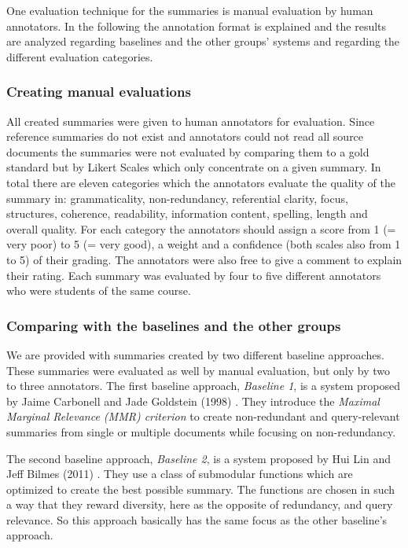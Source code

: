 One evaluation technique for the summaries is manual evaluation by human annotators. In the following the annotation format is explained and the results are analyzed regarding baselines and the other groups' systems and regarding the different evaluation categories.

\subsubsection{Creating manual evaluations}
All created summaries were given to human annotators for evaluation. Since reference summaries do not exist and annotators could not read all source documents the summaries were not evaluated by comparing them to a gold standard but by Likert Scales which only concentrate on a given summary. In total there are eleven categories which the annotators evaluate the quality of the summary in: grammaticality, non-redundancy, referential clarity, focus, structures, coherence, readability, information content, spelling, length and overall quality. For each category the annotators should assign a score from 1 (= very poor) to 5 (= very good), a weight and a confidence (both scales also from 1 to 5) of their grading. The annotators were also free to give a comment to explain their rating. Each summary was evaluated by four to five different annotators who were students of the same course.

\subsubsection{Comparing with the baselines and the other groups}
We are provided with summaries created by two different baseline approaches. These summaries were evaluated as well by manual evaluation, but only by two to three annotators. The first baseline approach, \textit{Baseline 1}, is a system proposed by Jaime Carbonell and Jade Goldstein (1998) \cite{Carbonell:1998:UMD:290941.291025}. They introduce the \textit{Maximal Marginal Relevance (MMR) criterion} to create non-redundant and query-relevant summaries from single or multiple documents while focusing on non-redundancy.

The second baseline approach, \textit{Baseline 2}, is a system proposed by Hui Lin and Jeff Bilmes (2011) \cite{Lin:2011:CSF:2002472.2002537}. They use a class of submodular functions which are optimized to create the best possible summary. The functions are chosen in such a way that they reward diversity, here as the opposite of redundancy, and query relevance. So this approach basically has the same focus as the other baseline's approach.

